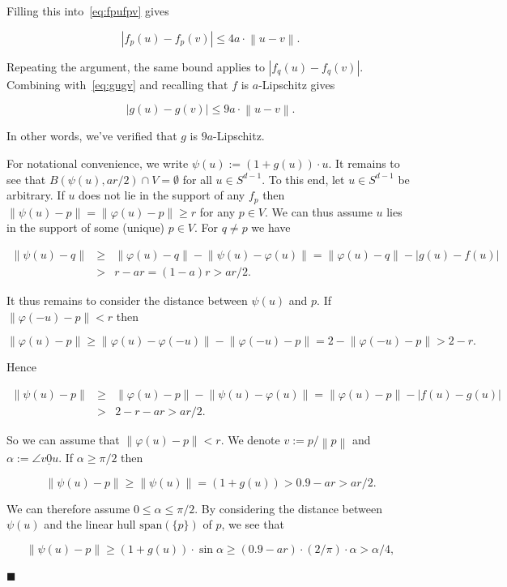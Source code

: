 \documentclass[11pt]{article}%
\newenvironment{proof}{\vspace{1ex}\noindent{\bf Proof.}}{\hspace*{\fill}$\blacksquare$\vspace{1ex}}
\newcommand{\norm}[1]{\ensuremath{\left\|#1\right\|}}
\newcommand{\orig}{\underline{0}}
\begin{document}
\begin{proof}
\noindent
Filling this into~\eqref{eq:fpufpv}
gives

$$ |f_p(u)-f_p(v)| \leq 4a \cdot \norm{u-v}. $$

\noindent
Repeating the argument, the same bound applies to $|f_q(u)-f_q(v)|$.
Combining with~\eqref{eq:gugv} and recalling that $f$ is $a$-Lipschitz gives

$$ |g(u)-g(v)| \leq 9a \cdot \norm{u-v}. $$

\noindent
In other words, we've verified that $g$ is $9a$-Lipschitz.

For notational convenience, we write $\psi(u) := (1+g(u))\cdot u$.
It remains to see that $B( \psi(u), a r/2 ) \cap V = \emptyset$ for all $u \in S^{d-1}$.
To this end, let $u \in S^{d-1}$ be arbitrary.
If $u$ does not lie in the support of any $f_p$ then 
$\norm{\psi(u)-p} = \norm{\varphi(u)-p} \geq r$ for any $p \in V$.
We can thus assume $u$ lies in the support of some (unique) $p \in V$.
For $q \neq p$ we have 

$$ \begin{array}{rcl} 
\norm{ \psi(u) - q} 
& \geq &  
\norm{\varphi(u)-q} - \norm{\psi(u)-\varphi(u)}  
= \norm{\varphi(u)-q} - |g(u)-f(u)| \\
& > & 
r - a r = (1-a)r > ar/2. 
\end{array} $$

It thus remains to consider the distance between $\psi(u)$ and $p$.
If $\norm{\varphi(-u)-p} < r$ then 

$$ \norm{\varphi(u)-p} \geq \norm{\varphi(u)-\varphi(-u)} - \norm{\varphi(-u)-p}
= 2 - \norm{\varphi(-u)-p} > 2 - r. $$

\noindent
Hence 

$$ \begin{array}{rcl}
\norm{\psi(u)-p} 
& \geq & \norm{\varphi(u)-p} - \norm{\psi(u)-\varphi(u)}
=  \norm{\varphi(u)-p} - |f(u)-g(u)| \\
& > & 2-r-ar > ar/2.  
\end{array} $$

\noindent
So we can assume that $\norm{\varphi(u)-p} < r$.
We denote $v := p/\norm{p}$ and $\alpha := \angle v\orig u$.
If $\alpha \geq \pi/2$ then 

$$ \norm{\psi(u)-p} \geq \norm{\psi(u)} = (1+g(u)) > 0.9-ar > ar/2. $$

\noindent
We can therefore assume $0 \leq \alpha \leq \pi/2$.
By considering the distance between $\psi(u)$ and the linear hull $\text{span}(\{p\})$ of $p$, we see that

$$ \norm{\psi(u)-p} \geq (1+g(u)) \cdot \sin \alpha 
\geq (0.9-ar) \cdot (2/\pi) \cdot \alpha > \alpha/4, $$


\end{proof}
\end{document}
